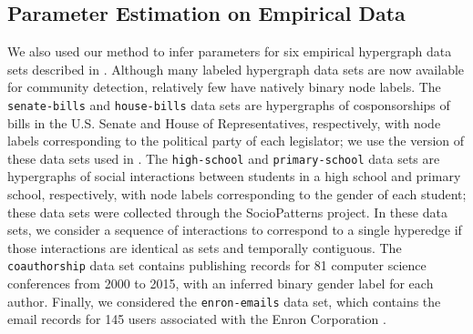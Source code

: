 \documentclass[aps,pre,reprint,superscriptaddress,nofootinbib]{revtex4-2}
\providecommand{\DIFaddend}{} %
\DeclareRobustCommand{\DIFaddend}{\DIFOaddend \let\includegraphics\DIFOincludegraphics} %
\begin{document}
\DIFaddend \subsection{Parameter Estimation on Empirical Data} \label{sec:sem-empirical}

We also used our method to infer parameters for six empirical hypergraph data sets described in . 
Although many labeled hypergraph data sets are now available for community detection, relatively few have natively binary node labels. 
The \texttt{senate-bills} and \texttt{house-bills} data sets \cite{fowler2006connecting,fowler2006legislative} are hypergraphs of cosponsorships of bills in the U.S. Senate and House of Representatives, respectively, with node labels corresponding to the political party of each legislator; we use the version of these data sets used in \cite{chodrowGenerativeHypergraphClustering2021}.
The \texttt{high-school} and \texttt{primary-school} data sets \cite{gemmetto2014mitigation,stehle2011high,mastrandrea2015contact} are hypergraphs of social interactions between students in a high school and primary school, respectively, with node labels corresponding to the gender of each student; these data sets were collected through the SocioPatterns project.
In these data sets, we consider a sequence of interactions to correspond to a single hyperedge if those interactions are identical as sets and temporally contiguous. 
The \texttt{coauthorship} data set \cite{agarwal2016women} contains publishing records for 81 computer science conferences from 2000 to 2015, with an inferred binary gender label for each author.
Finally, we considered the \texttt{enron-emails} data set, which contains the email records for 145 users associated with the Enron Corporation \cite{klimt2004enron}.
\end{document}
